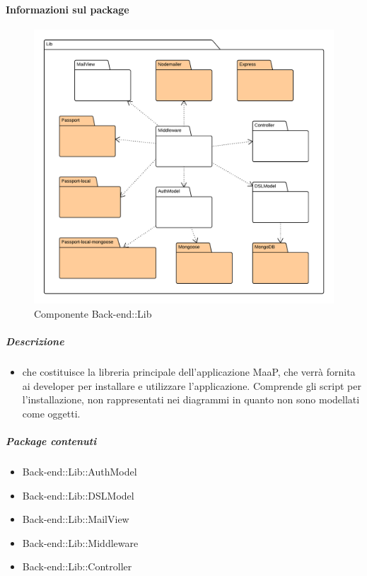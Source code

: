   \paragraph{Informazioni sul package} 
    \begin{figure}[H] 
      \begin{center} 
        \includegraphics[width=\textwidth]{packages/Back-end::Lib.png}  
        \caption{Componente Back-end::Lib}
      \end{center}  
    \end{figure} 
  \subparagraph{Descrizione} 
    \begin{itemize}
    \item[]  che costituisce la libreria principale dell'applicazione MaaP, che verrà fornita ai developer per installare e utilizzare l'applicazione. Comprende gli script per l'installazione, non rappresentati nei diagrammi in quanto non sono modellati come oggetti.
    \end{itemize} 
    \subparagraph{Package contenuti} 
    \begin{itemize}
        \item Back-end::Lib::AuthModel
        \item Back-end::Lib::DSLModel
        \item Back-end::Lib::MailView
        \item Back-end::Lib::Middleware
        \item Back-end::Lib::Controller
    \end{itemize}
    
